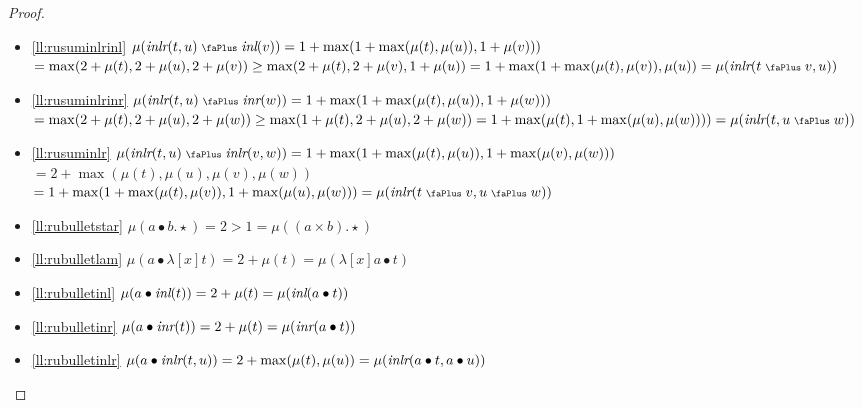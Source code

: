 \documentclass[screen, sigconf,authorversion,nonacm]{acmart}
\theoremstyle{acmdefinition}
\numberwithin{equation}{section}
\newcommand\abstr[1]{[#1]}
\newcommand\inl{\mbox{\it inl}}
\newcommand\inr{\mbox{\it inr}}
\newcommand\inlr{\mbox{\it inlr}}
\newcommand\plus{\mathrel{\text{\normalfont\scalebox{0.7}{\faPlus}}}}
\begin{document}
\begin{proof}
\begin{itemize}
  \item \eqref{ll:rusuminlrinl} $\mu(\inlr(t,u) \plus \inl(v)) = 1 +
  \max (1 + \max(\mu(t),\mu(u)), 1 + \mu(v)))$\\ $ = \max(2 + \mu(t),2
  + \mu(u),2 + \mu(v)) \geq \max(2 + \mu(t),2 + \mu(v), 1 + \mu(u)) =
  1 + \max(1+ \max(\mu(t),\mu(v)), \mu(u)) = \mu(\inlr(t \plus v,u))$

\item \eqref{ll:rusuminlrinr} $\mu(\inlr(t,u) \plus \inr(w)) = 1 +
\max (1 + \max(\mu(t),\mu(u)), 1 + \mu(w)))$\\ $ = \max(2 + \mu(t),2
+ \mu(u),2 + \mu(w)) \geq \max(1 + \mu(t),2 + \mu(u), 2 + \mu(w)) =
  1 + \max(\mu(t), 1+ \max(\mu(u),\mu(w)))) = \mu(\inlr(t, u \plus
  w))$

\item \eqref{ll:rusuminlr} $\mu(\inlr(t,u) \plus \inlr(v,w)) = 1 +
  \max (1 + \max(\mu(t),\mu(u)), 1 + \max(\mu(v),\mu(w)))$\\ $= 2 +
  \max (\mu(t),\mu(u), \mu(v),\mu(w))$\\ $= 1 + \max(1+
  \max(\mu(t),\mu(v)), 1 + \max(\mu(u),\mu(w))) = \mu(\inlr(t \plus
  v,u \plus w))$

\item \eqref{ll:rubulletstar} $\mu(a \bullet b.\star) = 2 > 1 = \mu((a
  \times b).\star)$

\item \eqref{ll:rubulletlam} $\mu(a \bullet \lambda \abstr{x} t) = 2 +
  \mu(t) =\mu(\lambda \abstr{x} a \bullet t)$

\item \eqref{ll:rubulletinl} $\mu(a \bullet \inl(t)) = 2 + \mu(t)
  =\mu(\inl(a \bullet t))$

\item \eqref{ll:rubulletinr} $\mu(a \bullet \inr(t)) = 2 + \mu(t) =
  \mu(\inr(a \bullet t))$

\item \eqref{ll:rubulletinlr} $\mu(a \bullet \inlr(t,u)) = 2 +
  \max(\mu(t),\mu(u)) = \mu(\inlr(a \bullet t,a \bullet u))$
  \qedhere
  \end{itemize} 
\end{proof}
\end{document}
